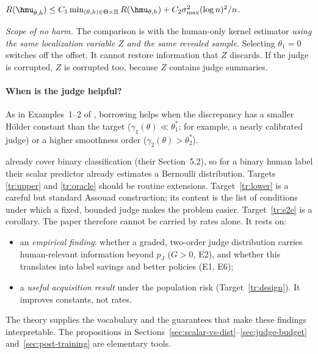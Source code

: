 \begin{target}
\label{tr:oracle}
$R(\hmu_{\hat\theta,\hat h})\le C_1\min_{(\theta,h)\in\Theta\times\mathbb H}R(\hmu_{\theta,h})
+C_2\sigma_{\max}^2(\log n)^2/n$.
\end{target}

\emph{Scope of no harm.} The comparison is with the human-only kernel estimator \emph{using the same
localization variable $Z$ and the same revealed sample}. Selecting $\theta_1=0$ switches off the
offset. It cannot restore information that $Z$ discards. If the judge is corrupted, $Z$ is
corrupted too, because $Z$ contains judge summaries.

\paragraph{When is the judge helpful?}
As in Examples~1--2 of \citet{li2026personalizing}, borrowing helps when the discrepancy has a
smaller H\"older constant than the target ($\gamma_1(\theta)\ll\theta_1^{*}$; for example, a nearly
calibrated judge) or a higher smoothness order ($\gamma_2(\theta)>\theta_2^{*}$).

\begin{remark}
\label{rem:novelty-theory}
\citet{li2026personalizing} already cover binary classification (their Section~5.2), so for a
binary human label their scalar predictor already estimates a Bernoulli distribution. Targets
\ref{tr:upper} and \ref{tr:oracle} should be routine extensions. Target~\ref{tr:lower} is a careful
but standard Assouad construction; its content is the list of conditions under which a fixed,
bounded judge makes the problem easier. Target~\ref{tr:e2e} is a corollary. The paper therefore
cannot be carried by rates alone. It rests on:
\begin{itemize}
  \item an \emph{empirical finding}: whether a graded, two-order judge distribution carries
        human-relevant information beyond $p_J$ ($G>0$, E2), and whether this translates into label
        savings and better policies (E1, E6);
  \item a \emph{useful acquisition result} under the population risk (Target~\ref{tr:design}). It
        improves constants, not rates.
\end{itemize}
The theory supplies the vocabulary and the guarantees that make these findings interpretable. The
propositions in Sections~\ref{sec:scalar-vs-dist}--\ref{sec:judge-budget} and~\ref{sec:post-training}
are elementary tools.
\end{remark}
